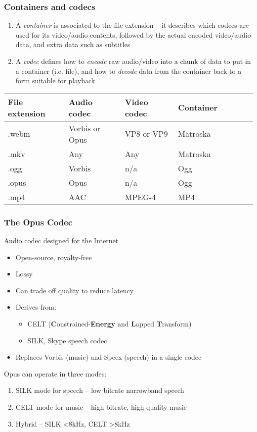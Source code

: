 \documentclass{beamer}
\begin{document}
\begin{frame}
	\frametitle{Containers and codecs}
	\begin{enumerate}
		\item
			A \textit{container} is associated to the file extension -- it describes which codecs are used for its video/audio contents, followed by the actual encoded video/audio data, and extra data such as subtitles
		\item
			A \textit{codec} defines how to \textit{encode} raw audio/video into a chunk of data to put in a container (i.e. file), and how to \textit{decode} data from the container back to a form suitable for playback
	\end{enumerate}
	\begin{table}[ht]
	\centering
	\begin{tabular}{llll c c c c}
		\hline\hline
		File extension & Audio codec & Video codec & Container \\ [0.5ex]
		\hline\hline
		.webm & Vorbis or Opus & VP8 or VP9 & Matroska \\ [0.5ex]
		.mkv & Any & Any & Matroska \\ [0.5ex]
		.ogg & Vorbis & n/a & Ogg \\ [0.5ex]
		.opus & Opus & n/a & Ogg \\ [0.5ex]
		.mp4 & AAC & MPEG-4 & MP4 \\ [0.5ex]
		\hline
	\end{tabular}
	\end{table}
\end{frame}

\begin{frame}
	\frametitle{The Opus Codec}
	Audio codec designed for the Internet
	\begin{itemize}
		\item
			Open-source, royalty-free
		\item
			Lossy
		\item
			Can trade off quality to reduce latency
		\item
			Derives from:
			\begin{itemize}
				\item
					CELT (\textbf{C}onstrained-\textbf{Energy} and \textbf{L}apped \textbf{T}ransform)
				\item
					SILK, Skype speech codec
			\end{itemize}
		\item
			Replaces Vorbis (music) and Speex (speech) in a single codec
	\end{itemize}
	Opus can operate in three modes:
	\begin{enumerate}
		\item
			SILK mode for speech -- low bitrate narrowband speech
		\item
			CELT mode for music -- high bitrate, high quality music
		\item
			Hybrid -- SILK <8kHz, CELT >8kHz
	\end{enumerate}
\end{frame}
\end{document}
